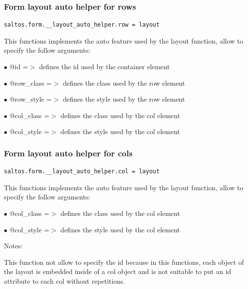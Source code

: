 \documentclass[a4paper]{article}
\begin{document}
\hypertarget{toc225}{}
\subsubsection{Form layout auto helper for rows}

\begin{lstlisting}
saltos.form.__layout_auto_helper.row = layout
\end{lstlisting}

This functions implements the auto feature used by the layout function, allow to specify the
follow arguments:

\begin{compactitem}
\item[\color{myblue}$\bullet$] @id              =$>$ defines the id used by the container element
\item[\color{myblue}$\bullet$] @row\_class       =$>$ defines the class used by the row element
\item[\color{myblue}$\bullet$] @row\_style       =$>$ defines the style used by the row element
\item[\color{myblue}$\bullet$] @col\_class       =$>$ defines the class used by the col element
\item[\color{myblue}$\bullet$] @col\_style       =$>$ defines the style used by the col element
\end{compactitem}

\hypertarget{toc226}{}
\subsubsection{Form layout auto helper for cols}

\begin{lstlisting}
saltos.form.__layout_auto_helper.col = layout
\end{lstlisting}

This functions implements the auto feature used by the layout function, allow to specify the
follow arguments:

\begin{compactitem}
\item[\color{myblue}$\bullet$] @col\_class       =$>$ defines the class used by the col element
\item[\color{myblue}$\bullet$] @col\_style       =$>$ defines the style used by the col element
\end{compactitem}

Notes:

This function not allow to specify the id because in this functions, each object of the
layout is embedded inside of a col object and is not suitable to put an id attribute
to each col without repetitions.
\end{document}
